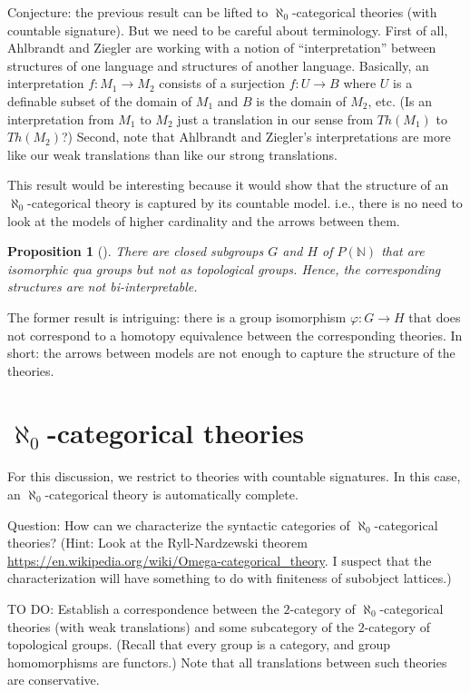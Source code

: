 \documentclass[12pt]{article}
\newtheorem*{prop}{Proposition}
\theoremstyle{definition}
\begin{document}
Conjecture: the previous result can be lifted to
$\aleph _0$-categorical theories (with countable signature). But we
need to be careful about terminology. First of all, Ahlbrandt and
Ziegler are working with a notion of ``interpretation'' between
structures of one language and structures of another language.
Basically, an interpretation $f:M_1\to M_2$ consists of a surjection
$f:U\to B$ where $U$ is a definable subset of the domain of $M_1$ and
$B$ is the domain of $M_2$, etc. (Is an interpretation from $M_1$ to
$M_2$ just a translation in our sense from $Th(M_1)$ to $Th(M_2)$?)
Second, note that Ahlbrandt and Ziegler's interpretations are more
like our weak translations than like our strong translations.

This result would be interesting because it would show that the
structure of an $\aleph _0$-categorical theory is captured by its
countable model. i.e., there is no need to look at the models of
higher cardinality and the arrows between them.

\begin{prop}[\cite{evans1990}] There are closed subgroups $G$ and $H$
  of $P(\mathbb{N})$ that are isomorphic qua groups but not as
  topological groups. Hence, the corresponding structures are not
  bi-interpretable. \end{prop}

The former result is intriguing: there is a group isomorphism
$\varphi :G\to H$ that does not correspond to a homotopy equivalence
between the corresponding theories. In short: the arrows between
models are not enough to capture the structure of the theories.

\section{$\aleph _0$-categorical theories}

For this discussion, we restrict to theories with countable
signatures. In this case, an $\aleph _0$-categorical theory is
automatically complete.

Question: How can we characterize the syntactic categories of
$\aleph _0$-categorical theories? (Hint: Look at the Ryll-Nardzewski
theorem
\url{https://en.wikipedia.org/wiki/Omega-categorical_theory}. I
suspect that the characterization will have something to do with
finiteness of subobject lattices.)

TO DO: Establish a correspondence between the $2$-category of
$\aleph _0$-categorical theories (with weak translations) and some
subcategory of the $2$-category of topological groups. (Recall that
every group is a category, and group homomorphisms are functors.) Note
that all translations between such theories are conservative.
\end{document}
